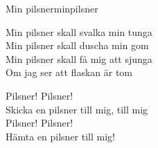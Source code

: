\begin{song}{Min pilsner}{minpilsner}
\begin{vers}
Min pilsner skall svalka min tunga\\
Min pilsner skall duscha min gom\\
Min pilsner skall få mig att sjunga\\
Om jag ser att flaskan är tom\\
\end{vers}
\begin{vers}
Pilsner! Pilsner!\\
Skicka en pilsner till mig, till mig\\
Pilsner! Pilsner!\\
Hämta en pilsner till mig!\\
\end{vers}
\end{song}
